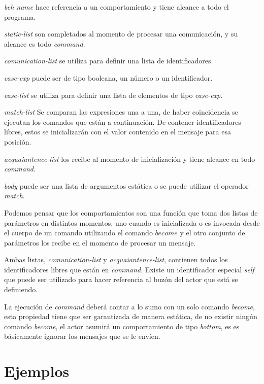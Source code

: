 \begin{description}
 \item \textit{beh name} hace referencia a un comportamiento y tiene alcance a todo el programa. 
 \item \textit{static-list} son completados al momento de procesar una comunicación, y su alcance es todo \textit{command}. 
 \item \textit{comunication-list} se utiliza para definir una lista de identificadores.
 \item \textit{case-exp} puede ser de tipo booleana, un número o un identificador. 
 \item \textit{case-list} se utiliza para definir una lista de elementos de tipo \textit{case-exp}.
 \item \textit{match-list} Se comparan las expresiones una a una, de haber coincidencia se ejecutan los comandos que están a continuación. De contener identificadores libres, estos se inicializarán con el valor contenido en el mensaje para esa posición.
 \item \textit{acquaiantence-list} los recibe al momento de inicialización y tiene alcance en todo \textit{command}.
 \item \textit{body} puede ser una lista de argumentos estática o se puede utilizar el operador \textit{match}.
\end{description}

Podemos pensar que los comportamientos son una función que toma dos listas de parámetros en distintos momentos, uno cuando es inicializada o es invocada desde el cuerpo de un comando utilizando el comando $become$ y el otro conjunto de parámetros los recibe en el momento de procesar un mensaje.

Ambas listas, \textit{comunication-list} y \textit{acquaiantence-list}, contienen todos los identificadores libres que están en \textit{command}. Existe un identificador especial \textit{self} que puede ser utilizado para hacer referencia al buzón del actor que está se definiendo. 

La ejecución de \textit{command} deberá contar a lo sumo con un solo comando \textit{become}, esta propiedad tiene que ser garantizada de manera estática, de no existir ningún comando \textit{become}, el actor asumirá un comportamiento de tipo \textit{bottom}, es es básicamente ignorar los mensajes que se le envíen.

\section{Ejemplos}

